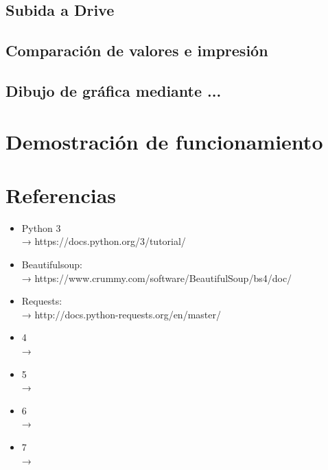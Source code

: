 \documentclass[12pt,letterpaper]{article}
\begin{document}
			\subsection{Subida a Drive}
			\subsection{Comparación de valores e impresión}
			\subsection{Dibujo de gráfica mediante ...}
		\newpage	
		\section{Demostración de funcionamiento}
		\newpage
		\section{Referencias}
			\begin{itemize}
				\item Python 3\\→ https://docs.python.org/3/tutorial/
				\item Beautifulsoup:\\→ https://www.crummy.com/software/BeautifulSoup/bs4/doc/\\
				\item Requests: \\→ http://docs.python-requests.org/en/master/
				\item 4\\→
				\item 5\\→
				\item 6\\→
				\item 7\\→
			\end{itemize}
		\newpage
\end{document}

